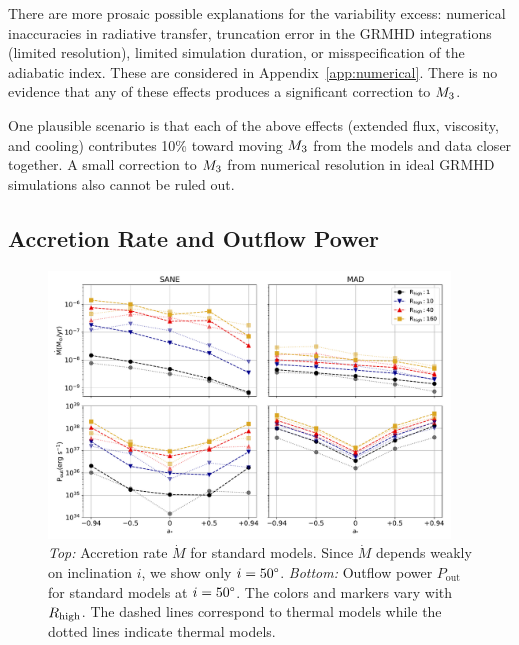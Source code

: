 There are more prosaic possible explanations for the variability excess: numerical inaccuracies in radiative transfer, truncation error in the GRMHD integrations (limited resolution), limited simulation duration, or misspecification of the adiabatic index.  These are considered in Appendix~\ref{app:numerical}.  There is no evidence that any of these effects produces a significant correction to $M_{3}$.

One plausible scenario is that each of the above effects (extended flux, viscosity, and cooling) contributes 10\% toward moving $M_{3}$ from the models and data closer together. A small correction to $M_{3}$ from numerical resolution in ideal GRMHD simulations also cannot be ruled out.



\subsection{Accretion Rate and Outflow Power}
\label{sec:accrate_outflowpower}



\begin{figure}
  \centering
  \includegraphics[width=0.95\textwidth]{figures/bhac_kharma_average_mdot_pout.pdf}
  \caption{{\it Top:} Accretion rate $\dot{M}$ for standard models. Since $\dot{M}$ depends weakly on inclination $i$, we show only $i=50\degree$. {\it Bottom:} Outflow power $P_\mathrm{out}$ for standard models at $i = 50\degree$. The colors and markers vary with $R_\mathrm{high}$. The dashed lines correspond to \kharma thermal models while the dotted lines indicate \bhac thermal models.}
  \label{fig:accretion_outflow_power_illinois_thermal}
\end{figure}


